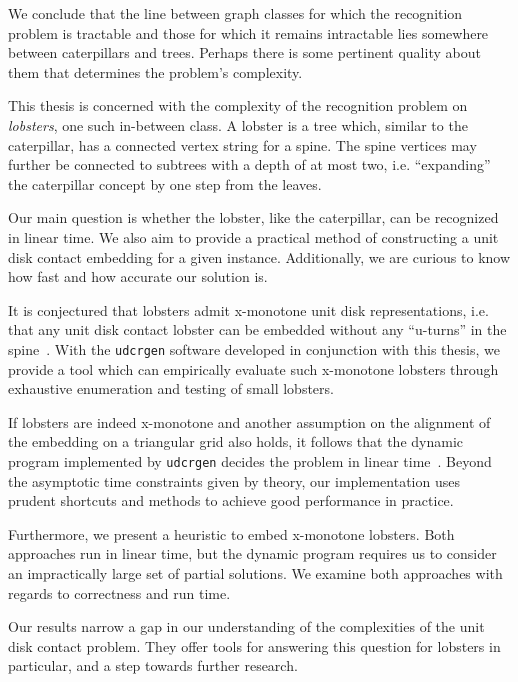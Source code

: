 We conclude that the line between graph classes for which the recognition problem is tractable and those for which it remains intractable lies somewhere between caterpillars and trees. Perhaps there is some pertinent quality about them that determines the problem's complexity.

This thesis is concerned with the complexity of the recognition problem on \emph{lobsters}, one such in-between class.
A lobster is a tree which, similar to the caterpillar, has a connected vertex string for a spine.
The spine vertices may further be connected to subtrees with a depth of at most two, i.e. ``expanding'' the caterpillar concept by one step from the leaves.

Our main question is whether the lobster, like the caterpillar, can be recognized in linear time. We also aim to provide a practical method of constructing a unit disk contact embedding for a given instance. Additionally, we are curious to know how fast and how accurate our solution is.

It is conjectured that lobsters admit x-monotone unit disk representations, i.e. that any unit disk contact lobster can be embedded without any ``u-turns'' in the spine~\cite{Bhore2021}. With the \texttt{udcrgen} software developed in conjunction with this thesis, we provide a tool which can empirically evaluate such x-monotone lobsters through exhaustive enumeration and testing of small lobsters.

If lobsters are indeed x-monotone and another assumption on the alignment of the embedding on a triangular grid also holds, it follows that the dynamic program implemented by \texttt{udcrgen} decides the problem in linear time~\cite{Bhore2021}. Beyond the asymptotic time constraints given by theory, our implementation uses prudent shortcuts and methods to achieve good performance in practice.

Furthermore, we present a heuristic to embed x-monotone lobsters. Both approaches run in linear time, but the dynamic program requires us to consider an impractically large set of partial solutions. We examine both approaches with regards to correctness and run time.

Our results narrow a gap in our understanding of the complexities of the unit disk contact problem. They offer tools for answering this question for lobsters in particular, and a step towards further research.

